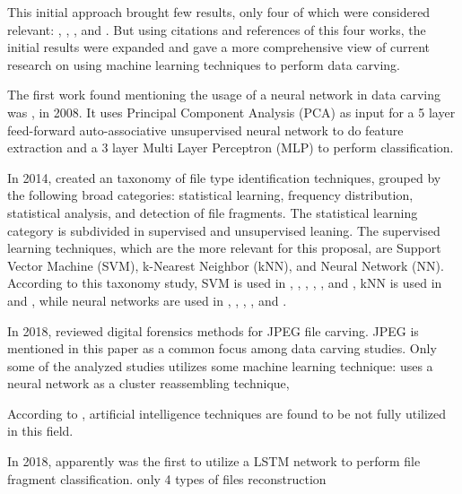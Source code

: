 This initial approach brought few results, only four of which were considered relevant: \cite{alamri_taxonomy_2014}, 
\cite{ali_review_2018}, \cite{sportiello_context-based_2012}, and \cite{beebe_sceadan:_2013}. But using citations and references of this four works, the initial results were expanded and gave a more comprehensive view of current research on using machine learning techniques to perform data carving.

The first work found mentioning the usage of a neural network in data carving was \cite{amirani_new_2008}, in 2008. It uses Principal Component Analysis (PCA) as input for a 5 layer feed-forward auto-associative unsupervised neural network to do feature extraction and a 3 layer Multi Layer Perceptron (MLP) to perform classification.

In 2014, \cite{alamri_taxonomy_2014} created an taxonomy of file type identification techniques, grouped by the following broad categories: statistical learning, frequency distribution, statistical analysis, and detection of file fragments. The statistical learning category is subdivided in supervised and unsupervised leaning. The supervised learning techniques, which are the more relevant for this proposal, are Support Vector Machine (SVM), k-Nearest Neighbor (kNN), and Neural Network (NN). According to this taxonomy study, SVM is used in \cite{ahmed_fast_2011}, \cite{amirani_feature-based_2013}, \cite{beebe_sceadan:_2013}, \cite{fitzgerald_using_2012}, \cite{gopal_statistical_2011}, and \cite{sportiello_context-based_2012}, kNN is used in \cite{ahmed_fast_2011} and \cite{gopal_statistical_2011}, while neural networks are used in \cite{ahmed_fast_2011}, \cite{ahmed_content-based_2010}, \cite{amirani_new_2008}, \cite{amirani_feature-based_2013}, and \cite{penrose_approaches_2013}.

In 2018, \cite{ali_review_2018} reviewed digital forensics methods for JPEG file carving. JPEG is mentioned in this paper as a common focus among data carving studies. Only some of the analyzed studies utilizes some machine learning technique: \cite{xu_reassembling_2009} uses a neural network as a cluster reassembling technique, 



According to \cite{ali_review_2018}, artificial intelligence techniques are found to be not fully utilized in this field.

In 2018, \cite{hiester_file_2018} apparently was the first to utilize a LSTM network to perform file fragment classification.
only 4 types of files
reconstruction

